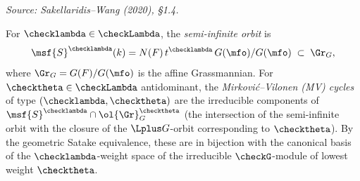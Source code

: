 \begin{definition}
  \label{def:MV-cycles}
%
  \textit{Source: Sakellaridis--Wang (2020), §1.4.}

  For \( \checklambda \in \checkLambda \), the \emph{semi-infinite orbit} is
  \[
    \msf{S}^{\checklambda}(k)
    = N(F)\, t^{\checklambda}\, G(\mfo) / G(\mfo)
    \;\subset\; \Gr_G,
  \]
  where \( \Gr_G = G(F)/G(\mfo) \) is the affine Grassmannian.
  For \( \checktheta \in \checkLambda \) antidominant,
  the \emph{Mirković--Vilonen (MV) cycles} of type \( (\checklambda, \checktheta) \) are the
  irreducible components of
  \( \msf{S}^{\checklambda} \cap \ol{\Gr}_G^{\checktheta} \)
  (the intersection of the semi-infinite orbit with the closure of the
  \( \Lplus G \)-orbit corresponding to \( \checktheta \)).
  By the geometric Satake equivalence, these are in bijection with the canonical basis of
  the \( \checklambda \)-weight space of the irreducible \( \checkG \)-module of lowest
  weight \( \checktheta \).
\end{definition}

